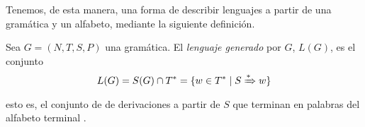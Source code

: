 Tenemos, de esta manera, una forma de describir lenguajes a partir de una gramática y un alfabeto, mediante la
siguiente definición.

\begin{definicion}Sea $G=(N,T,S,P)$ una gramática. El \textit{lenguaje generado} por $G$, $L(G)$,
es el conjunto
\begin{equation}
    L(G)=S(G)\cap T^*=\{w\in T^*\mid S\xRightarrow{*}w\}
\end{equation}
esto es, el conjunto de de derivaciones a partir de $S$ que terminan en palabras del alfabeto terminal 
\cite{harrison_1978}.
\end{definicion}

\endinput
